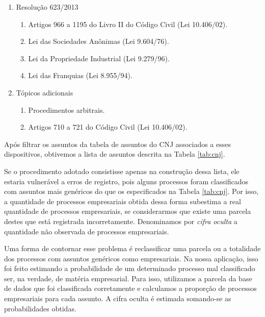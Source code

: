 \documentclass[]{book}
\providecommand{\tightlist}{%
  \setlength{\itemsep}{0pt}\setlength{\parskip}{0pt}}
\begin{document}
\begin{enumerate}
\def\labelenumi{\arabic{enumi}.}
\tightlist
\item
  Resolução 623/2013

  \begin{enumerate}
  \def\labelenumii{\arabic{enumii}.}
  \tightlist
  \item
    Artigos 966 a 1195 do Livro II do Código Civil (Lei 10.406/02).
  \item
    Lei das Sociedades Anônimas (Lei 9.604/76).
  \item
    Lei da Propriedade Industrial (Lei 9.279/96).
  \item
    Lei das Franquias (Lei 8.955/94).
  \end{enumerate}
\item
  Tópicos adicionais

  \begin{enumerate}
  \def\labelenumii{\arabic{enumii}.}
  \tightlist
  \item
    Procedimentos arbitrais.
  \item
    Artigos 710 a 721 do Código Civil (Lei 10.406/02).
  \end{enumerate}
\end{enumerate}

Após filtrar os assuntos da tabela de assuntos do CNJ associados a esses
dispositivos, obtivemos a lista de assuntos descrita na Tabela
\ref{tab:cnj}.

Se o procedimento adotado consistisse apenas na construção dessa lista,
ele estaria vulnerável a erros de registro, pois alguns processos foram
classificados com assuntos mais genéricos do que os especificados na
Tabela \ref{tab:cnj}. Por isso, a quantidade de processos empresariais
obtida dessa forma subestima a real quantidade de processos
empresariais, se considerarmos que existe uma parcela destes que está
registrada incorretamente. Denominamos por \emph{cifra oculta} a
quantidade não observada de processos empresariais.

Uma forma de contornar esse problema é reclassificar uma parcela ou a
totalidade dos processos com assuntos genéricos como empresariais. Na
nossa aplicação, isso foi feito estimando a probabilidade de um
determinado processo mal classificado ser, na verdade, de matéria
empresarial. Para isso, utilizamos a parcela da base de dados que foi
classificada corretamente e calculamos a proporção de processos
empresariais para cada assunto. A cifra oculta é estimada somando-se as
probabilidades obtidas.
\end{document}
